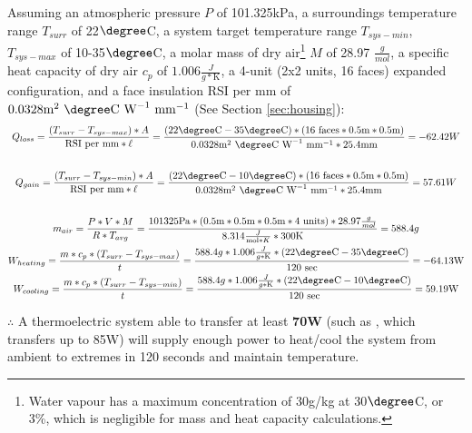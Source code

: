 Assuming an atmospheric pressure $P$ of 101.325kPa, a surroundings temperature range $T_{surr}$ of 22$\degree$C, a system target temperature range $T_{sys-min}$, $T_{sys-max}$ of 10-35$\degree$C, a molar mass of dry air\footnote{Water vapour has a maximum concentration of 30g/kg at 30$\degree$C, or 3\%, which is negligible for mass and heat capacity calculations.} $M$ of 28.97 $\frac g{mol}$, a specific heat capacity of dry air $c_p$ of $1.006 \frac{J}{g*\text{K}}$, a 4-unit (2x2 units, 16 faces) expanded configuration, and a face insulation RSI per mm of $0.0328\text{m}^2~  \degree \text{C}~\text{W}^{-1}~\text{mm}^{-1}$ (See Section \ref{sec:housing}):\\
\vspace{.05cm}
\begin{gather}
    \label{eqn:heatloss}
    Q_{loss}=\frac{(T_{surr}-T_{sys-max}) * A}{\text{RSI per mm} * \ell}=\frac{(22\degree \text{C}-35\degree \text{C}) * (16 \text{ faces} * 0.5\text{m} * 0.5\text{m})}{0.0328 \text{m}^2~  \degree \text{C}~\text{W}^{-1}~\text{mm}^{-1} * 25.4 \text{mm}}=-62.42 W\\\vspace{.05cm}\\
    \label{eqn:heatgain}
    Q_{gain}=\frac{(T_{surr}-T_{sys-min}) * A}{\text{RSI per mm} * \ell}=\frac{(22\degree \text{C}-10\degree \text{C}) * (16 \text{ faces} * 0.5\text{m} * 0.5\text{m})}{0.0328 \text{m}^2~  \degree \text{C}~\text{W}^{-1}~\text{mm}^{-1} * 25.4 \text{mm}}=57.61 W\\\vspace{.05cm}\\
    \label{eqn:airmass}
    m_{air}=\frac{P*V*M}{R*T_{avg}}=\frac{101325\text{Pa}*(0.5\text{m}*0.5\text{m}*0.5\text{m}*4\text{ units})*28.97\frac g{mol}}{8.314\frac{J}{\text{mol}*K}*300\text{K}}=588.4g\\
    \label{eqn:heating}
    W_{heating}=\frac{m*c_p*(T_{surr}-T_{sys-max})}{t}=\frac{588.4g*1.006\frac{J}{g*\text{K}}*(22\degree \text{C}-35\degree \text{C})}{120\text{ sec}}=-64.13\text{W}\\
    \label{eqn:cooling}
    W_{cooling}=\frac{m*c_p*(T_{surr}-T_{sys-min})}{t}=\frac{588.4g*1.006\frac{J}{g*\text{K}}*(22\degree \text{C}-10\degree \text{C})}{120\text{ sec}}=59.19\text{W}
\end{gather}

$\therefore$ A thermoelectric system able to transfer at least \textbf{70W} (such as \cite{peltier}, which transfers up to 85W) will supply enough power to heat/cool the system from ambient to extremes in 120 seconds and maintain temperature.

